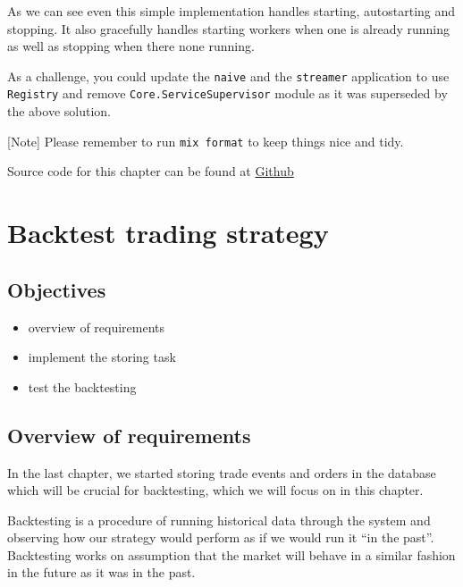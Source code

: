 \documentclass[
]{book}
\providecommand{\tightlist}{%
  \setlength{\itemsep}{0pt}\setlength{\parskip}{0pt}}
\begin{document}
As we can see even this simple implementation handles starting, autostarting and stopping. It also gracefully handles starting workers when one is already running as well as stopping when there none running.

As a challenge, you could update the \texttt{naive} and the \texttt{streamer} application to use \texttt{Registry} and remove \texttt{Core.ServiceSupervisor} module as it was superseded by the above solution.

{[}Note{]} Please remember to run \texttt{mix\ format} to keep things nice and tidy.

Source code for this chapter can be found at \href{https://github.com/frathon/create-a-cryptocurrency-trading-bot-in-elixir-source-code/tree/chapter_14}{Github}

\hypertarget{backtest-trading-strategy}{%
\chapter{Backtest trading strategy}\label{backtest-trading-strategy}}

\hypertarget{objectives-14}{%
\section{Objectives}\label{objectives-14}}

\begin{itemize}
\tightlist
\item
  overview of requirements
\item
  implement the storing task
\item
  test the backtesting
\end{itemize}

\hypertarget{overview-of-requirements-2}{%
\section{Overview of requirements}\label{overview-of-requirements-2}}

In the last chapter, we started storing trade events and orders in the database which will be crucial for backtesting, which we will focus on in this chapter.

Backtesting is a procedure of running historical data through the system and observing how our strategy would perform as if we would run it ``in the past''. Backtesting works on assumption that the market will behave in a similar fashion in the future as it was in the past.
\end{document}
